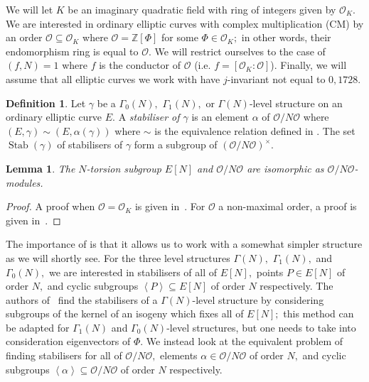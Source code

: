\documentclass[11pt,a4paper]{amsart}
\theoremstyle{plain}
\newtheorem{lem}[thm]{Lemma}
\theoremstyle{definition}
\newtheorem{defn}[thm]{Definition}
\theoremstyle{remark}
\DeclareMathOperator{\Stab}{Stab}
\begin{document}
We will let $K$ be an imaginary quadratic field with ring of integers given by $\mathcal{O}_K.$ We are interested in ordinary elliptic curves with complex multiplication (CM) by an order $\mathcal{O} \subseteq \mathcal{O}_K$ where $\mathcal{O} = \mathbb{Z}[\Phi]$ for some $\Phi \in \mathcal{O}_{K};$ in other words, their endomorphism ring is equal to $\mathcal{O}.$ We will restrict ourselves to the case of $(f, N) = 1$ where $f$ is the conductor of $\mathcal{O}$ (i.e. $f = [\mathcal{O}_K : \mathcal{O}]$). Finally, we will assume that all elliptic curves we work with have $j$-invariant not equal to $0, 1728.$
\begin{defn}
Let $\gamma$ be a $\Gamma_0(N),$ $\Gamma_1(N),$ or $\Gamma(N)$-level structure on an ordinary elliptic curve $E.$ A \emph{stabiliser of $\gamma$} is an element $\alpha$ of $\mathcal{O}/N \mathcal{O}$ where $(E, \gamma) \sim (E, \alpha(\gamma))$ where $\sim$ is the equivalence relation defined in . The set $\Stab(\gamma)$ of stabilisers of $\gamma$ form a subgroup of $(\mathcal{O}/N \mathcal{O})^{\times}.$
\end{defn}
\begin{lem}\label{lem:O/N isomorphism}
  The $N$-torsion subgroup $E[N]$ and $\mathcal{O}/N\mathcal{O}$ are isomorphic as $\mathcal{O}/N\mathcal{O}$-modules.
\end{lem}
\begin{proof}
 A proof when $\mathcal{O} = \mathcal{O}_K$ is given in~\cite[Prop.~II.1.4]{AAEC}. For $\mathcal{O}$ a non-maximal order, a proof is given in~\cite[3.1~Lemma~1]{class-group-action-oriented}.
\end{proof}

The importance of  is that it allows us to work with a somewhat simpler structure as we will shortly see. For the three level structures $\Gamma(N),$ $\Gamma_1(N),$ and $\Gamma_0(N),$ we are interested in stabilisers of all of $E[N],$ points $P \in E[N]$ of order $N,$ and cyclic subgroups $\left\langle P \right\rangle \subseteq E[N]$ of order $N$ respectively. The authors of~\cite{CSIDH-w-LS} find the stabilisers of a $\Gamma(N)$-level structure by considering subgroups of the kernel of an isogeny which fixes all of $E[N];$ this method can be adapted for $\Gamma_1(N)$ and $\Gamma_0(N)$-level structures, but one needs to take into consideration eigenvectors of $\Phi.$ We instead look at the equivalent problem of finding stabilisers for all of $\mathcal{O}/N\mathcal{O},$ elements $\alpha \in \mathcal{O}/N\mathcal{O}$ of order $N,$ and cyclic subgroups $\left\langle \alpha \right\rangle \subseteq \mathcal{O}/N\mathcal{O}$ of order $N$ respectively.
\end{document}
